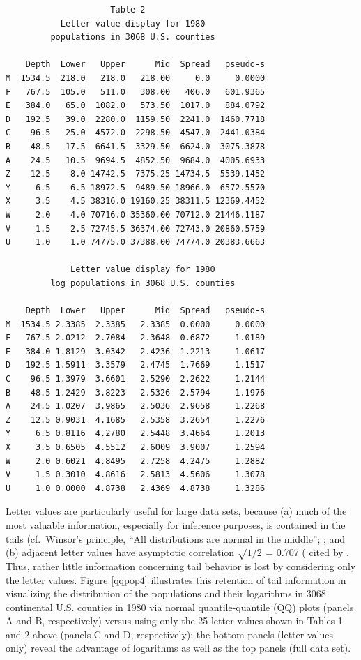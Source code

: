 \documentclass[oneside]{article}
\begin{document}
\begin{verbatim}
                     Table 2
           Letter value display for 1980
         populations in 3068 U.S. counties

    Depth  Lower   Upper      Mid  Spread   pseudo-s
M  1534.5  218.0   218.0   218.00     0.0     0.0000
F   767.5  105.0   511.0   308.00   406.0   601.9365
E   384.0   65.0  1082.0   573.50  1017.0   884.0792
D   192.5   39.0  2280.0  1159.50  2241.0  1460.7718
C    96.5   25.0  4572.0  2298.50  4547.0  2441.0384
B    48.5   17.5  6641.5  3329.50  6624.0  3075.3878
A    24.5   10.5  9694.5  4852.50  9684.0  4005.6933
Z    12.5    8.0 14742.5  7375.25 14734.5  5539.1452
Y     6.5    6.5 18972.5  9489.50 18966.0  6572.5570
X     3.5    4.5 38316.0 19160.25 38311.5 12369.4452
W     2.0    4.0 70716.0 35360.00 70712.0 21446.1187
V     1.5    2.5 72745.5 36374.00 72743.0 20860.5759
U     1.0    1.0 74775.0 37388.00 74774.0 20383.6663

             Letter value display for 1980
         log populations in 3068 U.S. counties

    Depth  Lower   Upper      Mid  Spread   pseudo-s
M  1534.5 2.3385  2.3385   2.3385  0.0000     0.0000
F   767.5 2.0212  2.7084   2.3648  0.6872     1.0189
E   384.0 1.8129  3.0342   2.4236  1.2213     1.0617
D   192.5 1.5911  3.3579   2.4745  1.7669     1.1517
C    96.5 1.3979  3.6601   2.5290  2.2622     1.2144
B    48.5 1.2429  3.8223   2.5326  2.5794     1.1976
A    24.5 1.0207  3.9865   2.5036  2.9658     1.2268
Z    12.5 0.9031  4.1685   2.5358  3.2654     1.2276
Y     6.5 0.8116  4.2780   2.5448  3.4664     1.2013
X     3.5 0.6505  4.5512   2.6009  3.9007     1.2594
W     2.0 0.6021  4.8495   2.7258  4.2475     1.2882
V     1.5 0.3010  4.8616   2.5813  4.5606     1.3078
U     1.0 0.0000  4.8738   2.4369  4.8738     1.3286
\end{verbatim}

Letter values are particularly useful for large data sets,
because (a) much of the most valuable information, especially
for inference purposes, is contained in the tails
(cf.~Winsor's principle, ``All distributions are normal
in the middle'';  \citep[457]{tukey60} ; and (b) adjacent
letter values have asymptotic correlation $\sqrt{1/2}$ = 0.707
(\citep{mosteller46} cited by \citet[51--52]{dchlv}.
Thus, rather little information concerning tail behavior
is lost by considering only the letter values.  Figure \ref{qqpop4}
illustrates this retention of tail information in visualizing the
distribution of the populations and their logarithms
in 3068 continental U.S. counties in 1980 via
normal quantile-quantile (QQ) plots (panels A and B, respectively)
versus using only the 25 letter values shown in Tables 1 and 2 above
(panels C and D, respectively); the bottom panels (letter values only)
reveal the advantage of logarithms as well as the top panels (full data set).
\end{document}

